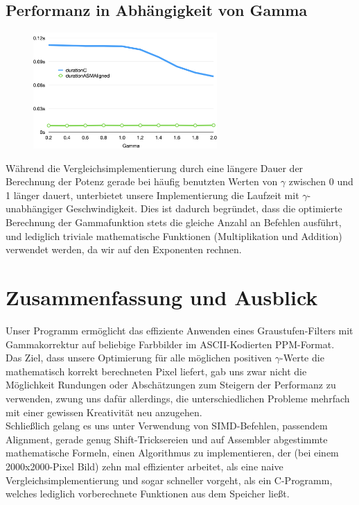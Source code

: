 \documentclass[course=erap]{aspdoc}
\begin{document}
	\subsection{Performanz in Abhängigkeit von Gamma}
	\begin{figure}
		\includegraphics[width=7cm]{Images/Gamma.png}
	\end{figure}
	Während die Vergleichsimplementierung durch eine längere Dauer der Berechnung der Potenz gerade bei häufig benutzten Werten von $\gamma$ zwischen 0 und 1 länger dauert, unterbietet unsere Implementierung die Laufzeit mit $\gamma$-unabhängiger Geschwindigkeit.
	Dies ist dadurch begründet, dass die optimierte Berechnung der Gammafunktion stets die gleiche Anzahl an Befehlen ausführt, und lediglich triviale mathematische Funktionen (Multiplikation und Addition) verwendet werden, da wir auf den Exponenten rechnen.




	\section{Zusammenfassung und Ausblick}
	Unser Programm ermöglicht das effiziente Anwenden eines Graustufen-Filters mit Gammakorrektur auf beliebige Farbbilder im ASCII-Kodierten PPM-Format.\\
	Das Ziel, dass unsere Optimierung für alle möglichen positiven $\gamma$-Werte die mathematisch korrekt berechneten Pixel liefert, gab uns zwar nicht die Möglichkeit Rundungen oder Abschätzungen zum Steigern der Performanz zu verwenden, zwung uns dafür allerdings, die unterschiedlichen Probleme mehrfach mit einer gewissen Kreativität neu anzugehen.\\
	Schließlich gelang es uns unter Verwendung von SIMD-Befehlen, passendem Alignment, gerade genug Shift-Tricksereien und auf Assembler abgestimmte mathematische Formeln, einen Algorithmus zu implementieren, der (bei einem 2000x2000-Pixel Bild) zehn mal effizienter arbeitet, als eine naive Vergleichsimplementierung und sogar schneller vorgeht, als ein C-Programm, welches lediglich vorberechnete Funktionen aus dem Speicher ließt.\\
\end{document}
